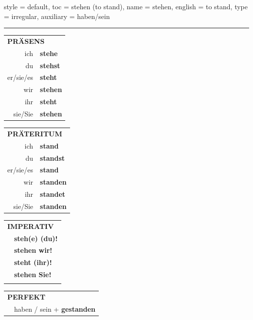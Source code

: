 \begin{verbentry}{
  style = {default},
  toc = {stehen (to stand)},
  name = {stehen},
  english = {to stand},
  type = {irregular},
  auxiliary = {haben/sein}
}
 
    
     \vspace{5pt}

    \hrule
    
    \vspace{5pt}

  \begin{tabular}{rl}
     \multicolumn{2}{l}{\textbf{PRÄSENS} }\\
    ich & \textbf{stehe}\\
    du & \textbf{stehst}\\
    er/sie/es & \textbf{steht}\\
    wir & \textbf{stehen}\\
    ihr & \textbf{steht}\\
    sie/Sie & \textbf{stehen}\\
  \end{tabular}
  \hfill
     \begin{tabular}{rl}
    \multicolumn{2}{l}{\textbf{PRÄTERITUM} }\\
    ich & \textbf{stand}\\
    du & \textbf{standst}\\
    er/sie/es & \textbf{stand}\\
    wir & \textbf{standen}\\
    ihr & \textbf{standet}\\
    sie/Sie & \textbf{standen}\\
  \end{tabular}
  \hfill
  \begin{tabular}{rl}
     \multicolumn{2}{l}{\textbf{IMPERATIV} }\\
   & \textbf{steh(e) (du)!}\\
   & \textbf{stehen wir!}\\
   & \textbf{steht (ihr)!}\\
   & \textbf{stehen Sie!}\\
   & \vspace{10pt}
  \end{tabular}

    \vspace{10pt}

 \begin{tabular}{rl}
     \multicolumn{2}{l}{\textbf{PERFEKT}}\\
  &  haben / sein + \textbf{gestanden}\\
  \end{tabular}
\hfill
   \begin{tabular}{rl}
   

\end{tabular}
\end{verbentry}
